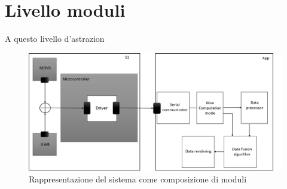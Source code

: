 \section{Livello moduli}

A questo livello d'astrazion
\begin{figure}[H]  
\includegraphics[scale=0.3 ]{DescrizioneDelSistema/sistema_liv2.png}
\caption{Rappresentazione del sistema come composizione di moduli}
\label{fig:PropProf}
\end{figure}


